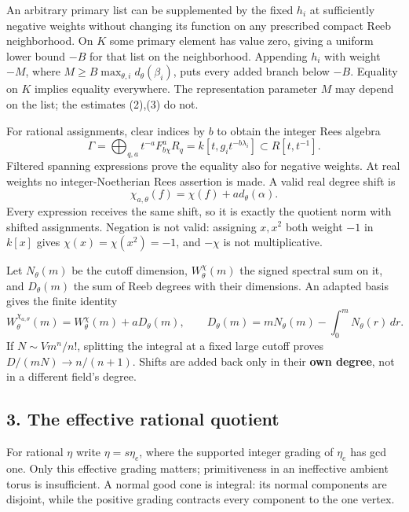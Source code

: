 \documentclass[
  10pt,
]{article}
\begin{document}
An arbitrary primary list can be supplemented by the fixed \(h_i\) at
sufficiently negative weights without changing its function on any
prescribed compact Reeb neighborhood. On \(K\) some primary element has
value zero, giving a uniform lower bound \(-B\) for that list on the
neighborhood. Appending \(h_i\) with weight \(-M\), where
\(M\geq B\max_{\theta,i}d_\theta(\beta_i)\), puts every added branch
below \(-B\). Equality on \(K\) implies equality everywhere. The
representation parameter \(M\) may depend on the list; the estimates
(2),(3) do not.

For rational assignments, clear indices by \(b\) to obtain the integer
Rees algebra
\[ \Gamma=\bigoplus_{q,a}t^{-a}F^a_{b\chi}R_q=k[t,g_it^{-b\lambda_i}]\subset R[t,t^{-1}].            \tag{16}\]
Filtered spanning expressions prove the equality also for negative
weights. At real weights no integer-Noetherian Rees assertion is made. A
valid real degree shift is
\[ \chi_{a,\theta}(f)=\chi(f)+a d_\theta(\alpha).                                                \tag{17}\]
Every expression receives the same shift, so it is exactly the quotient
norm with shifted assignments. Negation is not valid: assigning
\(x,x^2\) both weight \(-1\) in \(k[x]\) gives \(\chi(x)=\chi(x^2)=-1\),
and \(-\chi\) is not multiplicative.

Let \(N_\theta(m)\) be the cutoff dimension, \(W_\theta^\chi(m)\) the
signed spectral sum on it, and \(D_\theta(m)\) the sum of Reeb degrees
with their dimensions. An adapted basis gives the finite identity
\[ W_\theta^{\chi_{a,\theta}}(m)=W_\theta^\chi(m)+aD_\theta(m),\qquad
 D_\theta(m)=mN_\theta(m)-\int_0^mN_\theta(r)\,dr.                                              \tag{18}\]
If \(N\sim Vm^n/n!\), splitting the integral at a fixed large cutoff
proves \(D/(mN)\to n/(n+1)\). Shifts are added back only in their
\textbf{own degree}, not in a different field's degree.

\subsection{3. The effective rational
quotient}\label{the-effective-rational-quotient}

For rational \(\eta\) write \(\eta=s\eta_e\), where the supported
integer grading of \(\eta_e\) has gcd one. Only this effective grading
matters; primitiveness in an ineffective ambient torus is insufficient.
A normal good cone is integral: its normal components are disjoint,
while the positive grading contracts every component to the one vertex.
\end{document}
